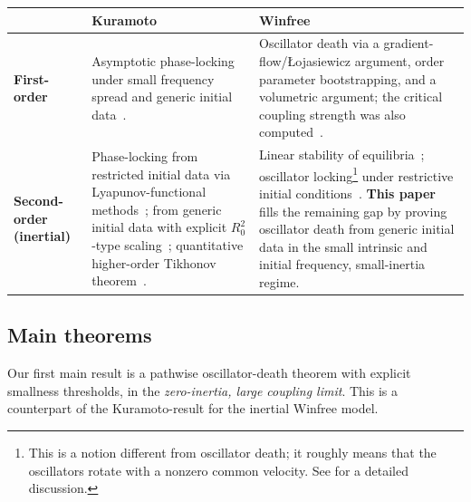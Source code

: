 \documentclass[11pt,reqno]{amsart}
\theoremstyle{definition}
\theoremstyle{remark}
\begin{document}
\medskip
\begin{center}
\renewcommand{\arraystretch}{1.6}
\begin{tabular}{@{}p{}|p{}|p{}@{}}
 & \textbf{Kuramoto} & \textbf{Winfree} \\ \hline
\textbf{First-order}
 & Asymptotic phase-locking under small frequency spread and generic initial data~\cite{ha2016emergence,ha2020asymptotic}.
 & Oscillator death via a gradient-flow/\L ojasiewicz argument, order parameter bootstrapping, and a volumetric argument; the critical coupling strength was also computed~\cite{ryoo2026oscillator}. \\ \hline
\textbf{Second-order (inertial)}
 & Phase-locking from restricted initial data via Lyapunov-functional methods~\cite{choi2014complete}; from generic initial data with explicit $R_0^2$-type scaling~\cite{cho2025quantitative}; quantitative higher-order Tikhonov theorem~\cite{cho2025inertia}.
 & Linear stability of equilibria~\cite{ha2021emergent}; oscillator locking\footnote{This is a notion different from oscillator death; it roughly means that the oscillators rotate with a nonzero common velocity. See \cite[Section 3.1]{ryoo2026oscillator} for a detailed discussion.} under restrictive initial conditions~\cite{kang2022emergence}. \textbf{This paper} fills the remaining gap by proving oscillator death from generic initial data in the small intrinsic and initial frequency, small-inertia regime. \\
\end{tabular}
\end{center}
\medskip


\subsection{Main theorems}
Our first main result is a pathwise oscillator-death theorem with
explicit smallness thresholds, in the \emph{zero-inertia, large coupling limit}. This is a counterpart of the Kuramoto-result \cite[Theorem 1.1]{cho2025quantitative} for the inertial Winfree model.
\end{document}
